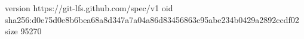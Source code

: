 version https://git-lfs.github.com/spec/v1
oid sha256:d0e75d0e8b6bea68a8d347a7a04a86d83456863c95abe234b0429a2892ccdf02
size 95270
